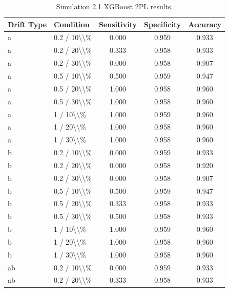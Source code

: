 \begin{table}[!h]
\centering
\caption{\label{tab:tab:sim21_xgb_2pl}Simulation 2.1 XGBoost 2PL results.}
\centering
\begin{tabular}[t]{llccc}
\toprule
Drift Type & Condition & Sensitivity & Specificity & Accuracy\\
\midrule
a & 0.2 / 10\textbackslash{}\textbackslash{}\% & 0.000 & 0.959 & 0.933\\
a & 0.2 / 20\textbackslash{}\textbackslash{}\% & 0.333 & 0.958 & 0.933\\
a & 0.2 / 30\textbackslash{}\textbackslash{}\% & 0.000 & 0.958 & 0.907\\
a & 0.5 / 10\textbackslash{}\textbackslash{}\% & 0.500 & 0.959 & 0.947\\
a & 0.5 / 20\textbackslash{}\textbackslash{}\% & 1.000 & 0.958 & 0.960\\
\addlinespace
a & 0.5 / 30\textbackslash{}\textbackslash{}\% & 1.000 & 0.958 & 0.960\\
a & 1 / 10\textbackslash{}\textbackslash{}\% & 1.000 & 0.959 & 0.960\\
a & 1 / 20\textbackslash{}\textbackslash{}\% & 1.000 & 0.958 & 0.960\\
a & 1 / 30\textbackslash{}\textbackslash{}\% & 1.000 & 0.958 & 0.960\\
b & 0.2 / 10\textbackslash{}\textbackslash{}\% & 0.000 & 0.959 & 0.933\\
\addlinespace
b & 0.2 / 20\textbackslash{}\textbackslash{}\% & 0.000 & 0.958 & 0.920\\
b & 0.2 / 30\textbackslash{}\textbackslash{}\% & 0.000 & 0.958 & 0.907\\
b & 0.5 / 10\textbackslash{}\textbackslash{}\% & 0.500 & 0.959 & 0.947\\
b & 0.5 / 20\textbackslash{}\textbackslash{}\% & 0.333 & 0.958 & 0.933\\
b & 0.5 / 30\textbackslash{}\textbackslash{}\% & 0.500 & 0.958 & 0.933\\
\addlinespace
b & 1 / 10\textbackslash{}\textbackslash{}\% & 1.000 & 0.959 & 0.960\\
b & 1 / 20\textbackslash{}\textbackslash{}\% & 1.000 & 0.958 & 0.960\\
b & 1 / 30\textbackslash{}\textbackslash{}\% & 1.000 & 0.958 & 0.960\\
ab & 0.2 / 10\textbackslash{}\textbackslash{}\% & 0.000 & 0.959 & 0.933\\
ab & 0.2 / 20\textbackslash{}\textbackslash{}\% & 0.333 & 0.958 & 0.933\\

\end{tabular}
\end{table}
